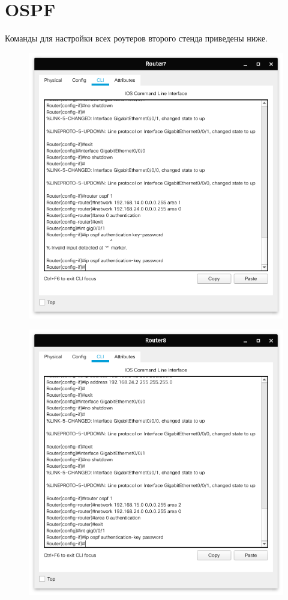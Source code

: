 \section{OSPF}%
Команды для настройки всех роутеров второго стенда приведены ниже.
\begin{figure}[H]
    \centering
    \includegraphics[width=0.8\linewidth]{images/scr05.png}
    \caption{}%
\end{figure}
\begin{figure}[H]
    \centering
    \includegraphics[width=0.8\linewidth]{images/scr06.png}
    \caption{}%
\end{figure}

